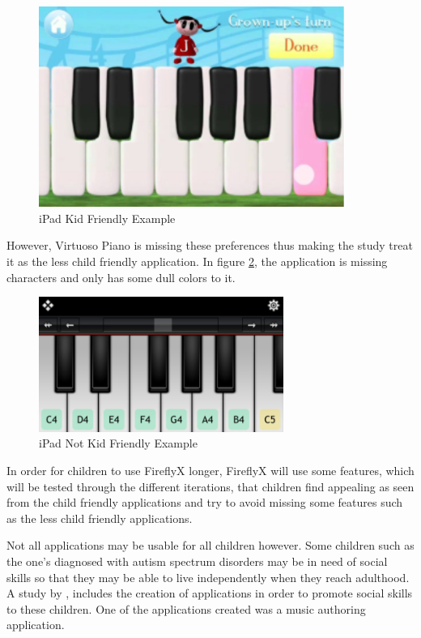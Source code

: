 \begin{figure}[H]
    \centering
    \includegraphics[width=10cm]{ipad_kid_friendy.PNG}
    \caption{iPad Kid Friendly Example \protect\cite{burton2016music}}
    \label{fig:iPad_friendly}
\end{figure}

However, Virtuoso Piano is missing these preferences thus making the study treat it as the less child friendly application. In figure \ref{fig:iPad_unfriendly}, the application is missing characters and only has some dull colors to it. 

\begin{figure}[H]
    \centering
    \includegraphics[width=8cm]{ipad_not_kid_friendly.PNG}
    \caption{iPad Not Kid Friendly Example \protect\cite{burton2016music}}
    \label{fig:iPad_unfriendly}
\end{figure}

In order for children to use FireflyX longer, FireflyX will use some features, which will be tested through the different iterations, that children find appealing as seen from the child friendly applications and try to avoid missing some features such as the less child friendly applications.


Not all applications may be usable for all children however. Some children such as the one’s diagnosed with autism spectrum disorders may be in need of social skills so that they may be able to live independently when they reach adulthood. A study by , includes the creation of applications in order to promote social skills to these children. One of the applications created was a music authoring application. 

